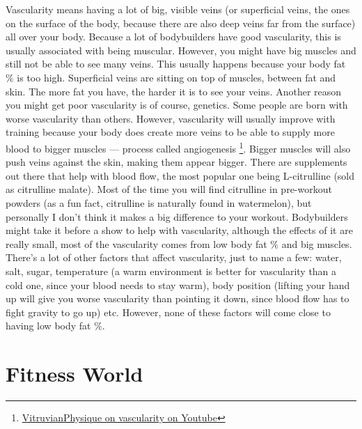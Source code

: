 \documentclass[openany, 12pt]{book}
\begin{document}
        Vascularity means having a lot of big, visible veins (or superficial veins, the ones on the surface of the body, because there are also deep veins far from the surface) all over your body.
        Because a lot of bodybuilders have good vascularity, this is usually associated with being muscular. However, you might have big muscles and still not be able to see many veins. This usually
        happens because your body fat \% is too high. Superficial veins are sitting on top of muscles, between fat and skin. The more fat you have, the harder it is to see your veins.
        Another reason you might get poor vascularity is of course, genetics. Some people are born with worse vascularity than others. However, vascularity will usually improve with training
        because your body does create more veins to be able to supply more blood to bigger muscles --- process called angiogenesis
        \footnote{\href{https://www.youtube.com/watch?v=N1oCJiw8oTY}{VitruvianPhysique on vascularity on Youtube}}. Bigger muscles will also push veins against the skin, making them appear bigger.
        There are supplements out there that help with blood flow, the most popular one being L-citrulline (sold as citrulline malate). Most of the time you will find citrulline in pre-workout
        powders (as a fun fact, citrulline is naturally found in watermelon), but personally I don't think it makes a big difference to your workout. Bodybuilders might take it before a show
        to help with vascularity, although the effects of it are really small, most of the vascularity comes from low body fat \% and big muscles.
        There's a lot of other factors that affect vascularity, just to name a few:
        water, salt, sugar, temperature (a warm environment is better for vascularity than a cold one, since your blood needs to stay warm), body position (lifting your hand up will give you worse
        vascularity than pointing it down, since blood flow has to fight gravity to go up) etc. However, none of these factors will come close to having low body fat \%.

  \chapter{Fitness World}
\end{document}
